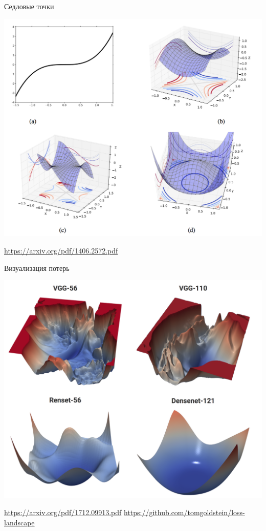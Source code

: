 \documentclass[notes,12pt, aspectratio=169]{beamer}
\begin{document}
\begin{frame}{Седловые точки}
\begin{center}
\includegraphics[width=0.5\paperwidth]{sedlo.png}
\end{center}
\vfill %
\footnotesize 
\color{blue} \url{https://arxiv.org/pdf/1406.2572.pdf}
\end{frame}


\begin{frame}{Визуализация потерь}
\begin{center}
	\includegraphics[width=0.5\paperwidth]{loss.png}
\end{center}
\vfill %
\footnotesize 
\color{blue} \url{https://arxiv.org/pdf/1712.09913.pdf} \newline  \url{https://github.com/tomgoldstein/loss-landscape}
\end{frame}
\end{document}
